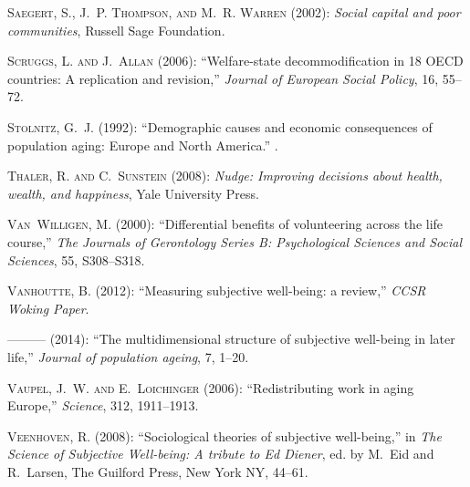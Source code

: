 \textsc{Saegert, S., J.~P. Thompson, and M.~R. Warren} (2002): \emph{Social
  capital and poor communities}, Russell Sage Foundation.

\textsc{Scruggs, L. and J.~Allan} (2006): \enquote{Welfare-state
  decommodification in 18 OECD countries: A replication and revision,}
  \emph{Journal of European Social Policy}, 16, 55--72.

\textsc{Stolnitz, G.~J.} (1992): \enquote{Demographic causes and economic
  consequences of population aging: Europe and North America.} .

\textsc{Thaler, R. and C.~Sunstein} (2008): \emph{Nudge: Improving decisions
  about health, wealth, and happiness}, Yale University Press.

\textsc{Van~Willigen, M.} (2000): \enquote{Differential benefits of
  volunteering across the life course,} \emph{The Journals of Gerontology
  Series B: Psychological Sciences and Social Sciences}, 55, S308--S318.

\textsc{Vanhoutte, B.} (2012): \enquote{Measuring subjective well-being: a
  review,} \emph{CCSR Woking Paper}.

---\hspace{-.1pt}---\hspace{-.1pt}--- (2014): \enquote{The multidimensional
  structure of subjective well-being in later life,} \emph{Journal of
  population ageing}, 7, 1--20.

\textsc{Vaupel, J.~W. and E.~Loichinger} (2006): \enquote{Redistributing work
  in aging Europe,} \emph{Science}, 312, 1911--1913.

\textsc{Veenhoven, R.} (2008): \enquote{Sociological theories of subjective
  well-being,} in \emph{The Science of Subjective Well-being: A tribute to Ed
  Diener}, ed. by M.~Eid and R.~Larsen, The Guilford Press, New York NY,
  44--61.

